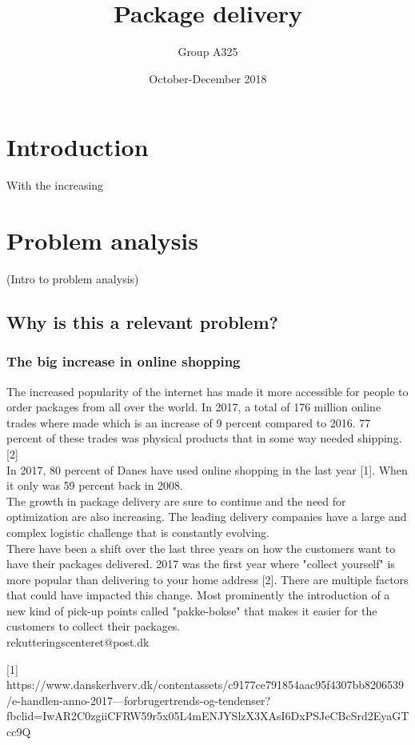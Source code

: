 \documentclass[12pt]{report}
\title{Package delivery}
\author{Group A325}
\date{October-December 2018}
\begin{document}
\maketitle
\chapter{Introduction}
With the increasing 


\chapter{Problem analysis}
(Intro to problem analysis)

\section{Why is this a relevant problem?}

\subsection{The big increase in online shopping}
The increased popularity of the internet has made it more accessible for people to order packages from all over the world. In 2017, a total of 176 million online trades where made which is an increase of 9 percent compared to 2016. 77 percent of these trades was physical products that in some way needed shipping.[2] \\
In 2017, 80 percent of Danes have used online shopping in the last year [1]. When it only was 59 percent back in 2008. \\
The growth in package delivery are sure to continue and the need for optimization are also increasing. The leading delivery companies have a large and complex logistic challenge that is constantly evolving. \\
There have been a shift over the last three years on how the customers want to have their packages delivered. 2017 was the first year where "collect yourself" is more popular than delivering to your home address [2]. There are multiple factors that could have impacted this change. Most prominently the introduction of a new kind of pick-up points called "pakke-bokse" that makes it easier for the customers to collect their packages. \\
rekutteringscenteret@post.dk

[1] https://www.danskerhverv.dk/contentassets/c9177ce791854aac95f4307bb8206539/e-handlen-anno-2017---forbrugertrends-og-tendenser?fbclid=IwAR2C0zgiiCFRW59r5x05L4mENJYSlzX3XAsI6DxPSJeCBcSrd2EyaGTcc9Q
\end{document}
